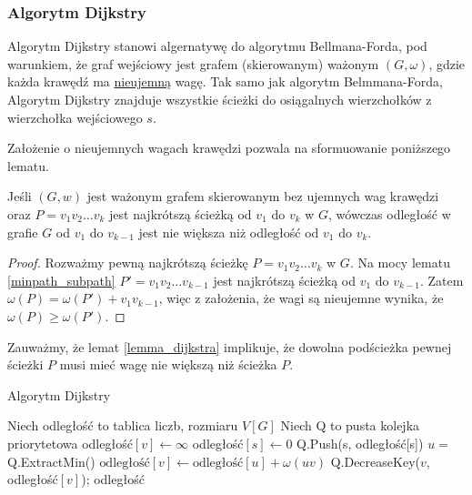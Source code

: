 \subsubsection{Algorytm Dijkstry}
Algorytm Dijkstry stanowi algernatywę do algorytmu
Bellmana-Forda, pod warunkiem, że graf wejściowy
jest grafem (skierowanym) ważonym $(G, \omega)$, 
gdzie każda krawędź ma \ul{nieujemną} wagę. 
Tak samo jak algorytm Belmmana-Forda, 
Algorytm Dijkstry znajduje wszystkie ścieżki 
do osiągalnych wierzchołków z 
wierzchołka wejściowego $s$. 

Założenie o nieujemnych wagach krawędzi pozwala na 
sformuowanie poniższego lematu.
\begin{lemma}
	Jeśli $(G, w)$ jest ważonym grafem skierowanym
	bez ujemnych wag krawędzi oraz $P = v_1v_2\dots v_k$
	jest najkrótszą ścieżką od $v_1$ do $v_k$ w $G$,
	wówczas odległość w grafie $G$ od $v_1$ do $v_{k-1}$ jest 
	nie większa niż odległość od $v_1$ do $v_k$.
	\begin{proof}
		Rozważmy pewną najkrótszą ścieżkę $P = v_1v_2
		\dots v_k$ w $G$. Na mocy lematu 
		\ref{minpath_subpath} $P'=v_1v_2 \dots v_{k-1}$
		jest najkrótszą ścieżką od $v_1$ do $v_{k-1}$.
		Zatem $\omega(P) = \omega(P') + v_1v_{k-1}$, więc
		z założenia, że wagi są nieujemne
		wynika, że  
		$\omega(P) \geq \omega(P')$. 
	\end{proof}
	\label{lemma_dijkstra}
\end{lemma}

Zauważmy, że lemat \ref{lemma_dijkstra} implikuje, że
dowolna podścieżka pewnej ścieżki $P$ musi mieć wagę
nie większą niż ścieżka $P$.

\begin{algorithm}[H]
	\caption{Algorytm Dijkstry}\label{dijkstra_alg}
	\begin{algorithmic}[1]
		\State Niech odległość to tablica liczb, rozmiaru $V[G]$
		\State Niech Q to pusta kolejka priorytetowa 
		\State odległość$[v]\gets\infty$
		\EndFor
		\State odległość$[s]\gets 0$
		\State Q.Push(s, odległość[s])
		\State $u =$ Q.ExtractMin()
		\State $\text{odległość}[v] \gets \text{odległość}[u] + \omega(uv)$
		\State Q.DecreaseKey($v$, odległość$[v]$);
		\EndIf
		\EndFor
		\EndWhile
		\State \Return odległość
		\EndProcedure
	\end{algorithmic}
	\label{dijkstra}
\end{algorithm}

